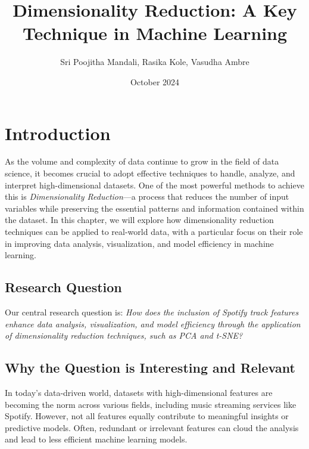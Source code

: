 \documentclass{article}
\title{Dimensionality Reduction: A Key Technique in Machine Learning}
\author{Sri Poojitha Mandali,  Rasika Kole, Vasudha Ambre}
\date{October 2024}
\begin{document}
\maketitle

\section{Introduction}
As the volume and complexity of data continue to grow in the field of data science, it becomes crucial to adopt effective techniques to handle, analyze, and interpret high-dimensional datasets. One of the most powerful methods to achieve this is \textit{Dimensionality Reduction}—a process that reduces the number of input variables while preserving the essential patterns and information contained within the dataset. In this chapter, we will explore how dimensionality reduction techniques can be applied to real-world data, with a particular focus on their role in improving data analysis, visualization, and model efficiency in machine learning.

\subsection{Research Question}
Our central research question is: \textit{How does the inclusion of Spotify track features enhance data analysis, visualization, and model efficiency through the application of dimensionality reduction techniques, such as PCA and t-SNE?}

\subsection{Why the Question is Interesting and Relevant}
In today's data-driven world, datasets with high-dimensional features are becoming the norm across various fields, including music streaming services like Spotify. However, not all features equally contribute to meaningful insights or predictive models. Often, redundant or irrelevant features can cloud the analysis and lead to less efficient machine learning models.
\end{document}
